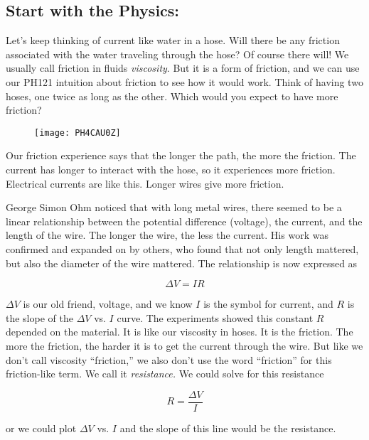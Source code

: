 \subsection{Start with the Physics:}

Let's keep thinking of current like water in a hose. Will there be any friction associated with the water traveling through the hose? Of course there will! We usually call friction in fluids \emph{viscosity}. But it is a form of friction, and we can use our PH121 intuition about friction to see how it would work. Think of having two hoses, one twice as long as the other. Which would you expect to have more friction? 

\begin{figure}[h!]
	\centering
    \texttt{[image: PH4CAU0Z]}
\end{figure}

Our friction experience says that the longer the path, the more the friction. The current has longer to interact with the hose, so it experiences more friction. Electrical currents are like this. Longer wires give more friction.

George Simon Ohm noticed that with long metal wires, there seemed to be a linear relationship between the potential difference (voltage), the current, and the length of the wire. The longer the wire, the less the current. His work was confirmed and expanded on by others, who found that not only length mattered, but also the diameter of the wire mattered. The relationship is now expressed as

\begin{equation*}
	\Delta V=IR
\end{equation*}

$\Delta V$ is our old friend, voltage, and we know $I$ is the symbol for current, and $R$ is the slope of the $\Delta V$ vs. $I$ curve. The experiments showed this constant $R$ depended on the material. It is like our viscosity in hoses. It is the friction. The more the friction, the harder it is to get the current through the wire. But like we don't call viscosity ``friction,'' we also don't use the word ``friction'' for this friction-like term. We call it \emph{resistance.} We could solve for this resistance 

\begin{equation*}
	R=\frac{\Delta V}{I}
\end{equation*}

or we could plot $\Delta V$ vs. $I$ and the slope of this line would be the resistance.

